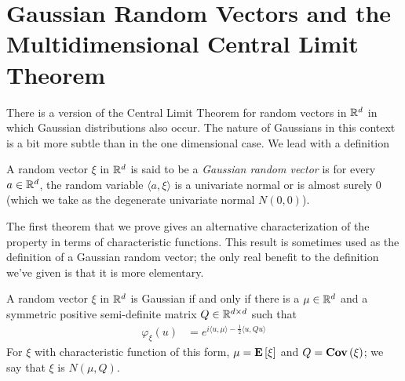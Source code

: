 \section{Gaussian Random Vectors and the Multidimensional Central
  Limit Theorem}
There is a version of the Central Limit Theorem for random vectors in
$\mathbb{R}^d$ in which Gaussian distributions also occur.  The nature of
Gaussians in this context is a bit more subtle than in the one
dimensional case.  We lead with a definition
\begin{defn}A random vector $\xi$ in $\mathbb{R}^d$ is said to be a \emph{Gaussian random
  vector} is for every $a \in \mathbb{R}^d$, the random variable $\langle
  a,\xi \rangle$ is a univariate normal or is almost surely 0 (which
  we take as the degenerate univariate normal $N(0,0)$).
\end{defn}
The first theorem that we prove gives an alternative characterization
of the property in terms of characteristic functions.  This result is
sometimes used as the definition of a Gaussian random vector; the only
real benefit to the definition we've given is that it is more
elementary.
\begin{thm}\label{GaussianVectorCharacteristicFunction}A random vector
  $\xi$ in $\mathbb{R}^d$ is Gaussian if and only if there is a $\mu \in
  \mathbb{R}^d$ and a symmetric positive semi-definite matrix $Q \in
  \mathbb{R}^{d\times d}$ such that 
\begin{align*}
\varphi_\xi(u) &= e^{i\langle u, \mu\rangle - \frac{1}{2}\langle u, Qu
\rangle}
\end{align*}
For $\xi$ with characteristic function of this form, $\mu =
\textbf{E}\left[\xi\right]$ and $Q = \textbf{Cov} \left (\xi \right )$; we say that $\xi$ is
$N(\mu, Q)$.
\end{thm}
